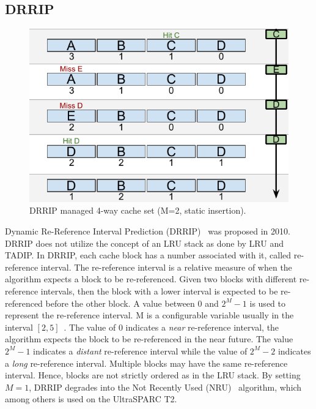 \subsection{DRRIP}
\label{sec:algorithms:drrip}

\begin{figure}[ht]
    \centering
    \includegraphics[width=\textwidth]{figures/algorithms/DRRIP}
    \caption{DRRIP managed 4-way cache set (M=2, static insertion).}
    \label{fig:algorithms:drrip_example}
\end{figure}

Dynamic Re-Reference Interval Prediction (DRRIP)~\cite{Jaleel2010} was proposed in 2010.
DRRIP does not utilize the concept of an LRU stack as done by LRU and TADIP.
In DRRIP, each cache block has a number associated with it, called re-reference interval.
The re-reference interval is a relative measure of when the algorithm expects a block to be re-referenced.
Given two blocks with different re-reference intervals, then the block with a lower interval is expected to be re-referenced before the other block.
A value between 0 and $2^M - 1$ is used to represent the re-reference interval.
M is a configurable variable usually in the interval $[2, 5]$~\cite{Jaleel2010}.
The value of 0 indicates a \textit{near} re-reference interval, the algorithm expects the block to be re-referenced in the near future.
The value $2^M - 1$ indicates a \textit{distant} re-reference interval while the value of $2^M - 2$ indicates a \textit{long} re-reference interval.
Multiple blocks may have the same re-reference interval. 
Hence, blocks are not strictly ordered as in the LRU stack.
By setting $M=1$, DRRIP degrades into the Not Recently Used (NRU)~\cite{Microsystems2007} algorithm, which among others is used on the UltraSPARC T2.

